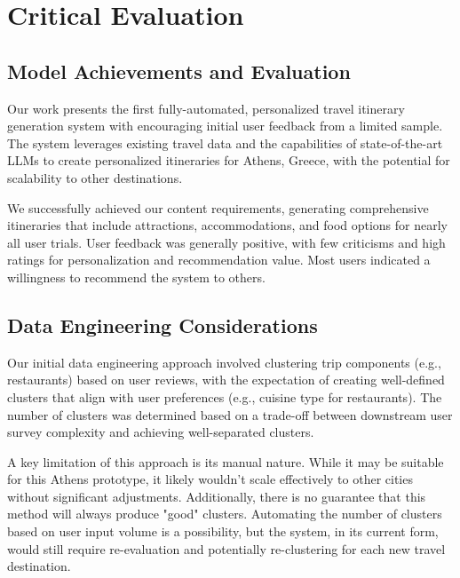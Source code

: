 \documentclass[12pt,a4paper]{report}
\begin{document}
\chapter{Critical Evaluation}


\section{Model Achievements and Evaluation}

Our work presents the first fully-automated, personalized travel itinerary generation system with encouraging initial user feedback from a limited sample. The system leverages existing travel data and the capabilities of state-of-the-art LLMs to create personalized itineraries for Athens, Greece, with the potential for scalability to other destinations.

We successfully achieved our content requirements, generating comprehensive itineraries that include attractions, accommodations, and food options for nearly all user trials. User feedback was generally positive, with few criticisms and high ratings for personalization and recommendation value. Most users indicated a willingness to recommend the system to others.

\section{Data Engineering Considerations}

Our initial data engineering approach involved clustering trip components (e.g., restaurants) based on user reviews, with the expectation of creating well-defined clusters that align with user preferences (e.g., cuisine type for restaurants). The number of clusters was determined based on a trade-off between downstream user survey complexity and achieving well-separated clusters.

A key limitation of this approach is its manual nature.  While it may be suitable for this Athens prototype, it likely wouldn't scale effectively to other cities without significant adjustments. Additionally, there is no guarantee that this method will always produce "good" clusters. Automating the number of clusters based on user input volume is a possibility, but the system, in its current form, would still require re-evaluation and potentially re-clustering for each new travel destination.
\end{document}
